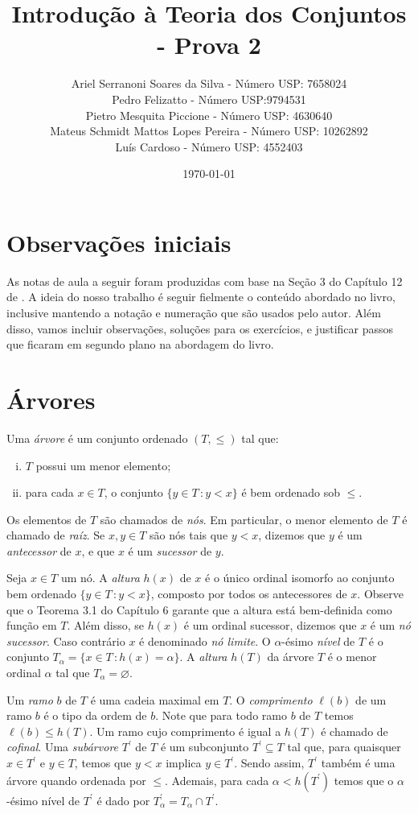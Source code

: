 \documentclass[a4paper]{article}
\title{Introdução à Teoria dos Conjuntos - Prova 2}
\author{Ariel Serranoni Soares da Silva  - Número USP: 7658024\\
Pedro Felizatto - Número USP:9794531\\
Pietro Mesquita Piccione - Número USP: 4630640\\
Mateus Schmidt Mattos Lopes Pereira - Número USP: 10262892\\
Luís Cardoso - Número USP: 4552403}
\date{\today}
\theoremstyle{plain}\newtheorem{teo}{Teorema}[section]
\theoremstyle{plain}\newtheorem{prop}[teo]{Proposição}
\theoremstyle{plain}\newtheorem{lem}[teo]{Lema}
\theoremstyle{plain}\newtheorem{cor}[teo]{Corolário}
\theoremstyle{definition}\newtheorem{defi}[teo]{Definição}
\theoremstyle{remark}\newtheorem{rem}[teo]{Observação}
\theoremstyle{definition}\newtheorem{example}[teo]{Exemplo}
\theoremstyle{remark}\newtheorem{step}{\bf Step}
\begin{document}
\maketitle
\section*{Observações iniciais}

As notas de aula a seguir foram produzidas com base na Seção 3 do Capítulo 12 de
\cite{jech}. A ideia do nosso trabalho é seguir fielmente o conteúdo abordado no
livro, inclusive mantendo a notação e numeração que são usados pelo autor.
Além disso, vamos incluir observações, soluções para os exercícios, e justificar
passos que ficaram em segundo plano na abordagem do livro.

\setcounter{section}{2}
\section{Árvores}
\begin{definition}
  Uma \emph{árvore} é um conjunto ordenado \((T,\leq)\) tal que:
 \begin{enumerate}[(i)]
  \item \(T\) possui um menor elemento;
  \item para cada \(x\in T\), o conjunto \(\{y\in T\,\colon y<x\}\) é bem
    ordenado sob \(\leq\).
  \end{enumerate}
\end{definition}
Os elementos de \(T\) são chamados de \emph{nós}. Em particular,
o menor elemento de \(T\) é chamado  de \emph{raíz}.
Se \(x,y\in T\) são nós tais que  \(y<x\), dizemos que \(y\) é um
\emph{antecessor} de \(x\), e que \(x\) é um \emph{sucessor} de \(y\).

Seja \(x\in T\) um nó.  A \emph{altura} \(h(x)\) de \(x\) é o único ordinal
isomorfo ao conjunto bem ordenado \mbox{\(\{y\in T\,\colon
y<x\}\),} composto por todos os antecessores de \(x\). Observe que o Teorema 3.1
do Capítulo 6 garante que a altura está bem-definida como função em \(T\).
Além disso, se \(h(x)\) é um ordinal sucessor, dizemos que \(x\) é um
\emph{nó sucessor}. Caso contrário \(x\) é denominado \emph{nó limite}.
O \(\alpha\)-ésimo \emph{nível} de \(T\) é o conjunto
\(T_\alpha=\{x\in T \,\colon h(x)=\alpha\}\). A \emph{altura} \(h(T)\) da árvore
\(T\) é o menor ordinal \(\alpha\) tal que \(T_\alpha=\varnothing\).  

Um \emph{ramo} \(b\) de \(T\) é uma cadeia maximal em \(T\).  O \emph{comprimento}
\(\ell(b)\) de um ramo \(b\) é o tipo da ordem de \(b\). Note que para
todo ramo \(b\) de \(T\) temos \(\ell (b)\leq h(T)\).
Um ramo cujo comprimento é igual a \(h(T)\) é chamado de \emph{cofinal}.
Uma \emph{subárvore} \(T^\prime\) de \(T\) é um subconjunto
\(T^\prime\subseteq T\) tal que, para quaisquer \(x\in T^\prime\) e \(y\in T\),
temos que \(y<x\) implica \(y\in T^\prime\).
Sendo assim, \(T^\prime\) também é uma árvore quando ordenada por \(\leq\).
Ademais, para cada \(\alpha < h(T^\prime)\) temos que o \(\alpha\)-ésimo nível
de \(T^\prime\) é dado por \(T_\alpha^\prime= T_\alpha \cap T^\prime\).
\end{document}
